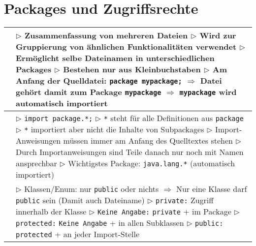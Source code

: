 \section{Packages und Zugriffsrechte}
	\begin{tabular}{ | p{4cm} p{13.5cm} | }
	\hline
	
	\makecell[l]{Package} & \makecell[l]{$\rhd$ Zusammenfassung von mehreren Dateien \\
	$\rhd$ Wird zur Gruppierung von ähnlichen Funktionalitäten verwendet \\
	$\rhd$ Ermöglicht selbe Dateinamen in unterschiedlichen Packages \\
	$\rhd$ Bestehen nur aus Kleinbuchstaben
	$\rhd$ Am Anfang der Quelldatei: \texttt{package mypackage;} \\
	$\Rightarrow$ Datei gehört damit zum Package \texttt{mypackage} \\
	$\Rightarrow$ \texttt{mypackage} wird automatisch importiert } \\ \hline
	
	\makecell[l]{Import} & \makecell[l]{
	$\rhd$ \texttt{import package.*;} \\
	$\rhd$ \texttt{*} steht für alle Definitionen aus \texttt{package} \\
	$\rhd$ \texttt{*} importiert aber nicht die Inhalte von Subpackages \\
	$\rhd$ Import-Anweisungen müssen immer am Anfang des Quelltextes stehen \\
	$\rhd$ Durch Importanweisungen sind Teile danach nur noch mit Namen ansprechbar \\
	$\rhd$ Wichtigstes Package: \texttt{java.lang.*} (automatisch importiert)} \\ \hline
	
	\makecell[l]{Zugriffsrechte} & \makecell[l]{$\rhd$ Klassen/Enum: nur \texttt{public} oder nichts \\
	\hspace{0.4cm} $\Rightarrow$ Nur eine Klasse darf \texttt{public} sein (Damit auch Dateiname) \\
	$\rhd$ \texttt{private:} Zugriff innerhalb der Klasse \\
	$\rhd$ \texttt{Keine Angabe:} \texttt{private} + im Package \\
	$\rhd$ \texttt{protected:} \texttt{Keine Angabe} + in allen Subklassen \\
	$\rhd$ \texttt{public:} \texttt{protected} + an jeder Import-Stelle } \\ \hline
	\end{tabular}



